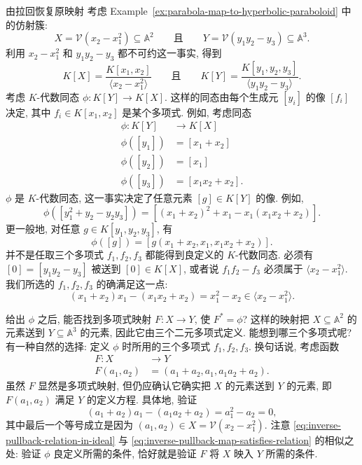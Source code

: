 \begin{Example}{由拉回恢复原映射}\leavevmode\label{ex:invert-pullback}
  考虑 Example~\ref{ex:parabola-map-to-hyperbolic-paraboloid} 中的仿射簇:
  \[
    X=\mathcal{V}(x_{2}-x_{1}^{2})\subseteq\mathbb{A}^{2}
    \qquad\text{且}\qquad
    Y=\mathcal{V}(y_{1}y_{2}-y_{3})\subseteq\mathbb{A}^{3}.
  \]
  利用 $x_{2}-x_{1}^{2}$ 和 $y_{1}y_{2}-y_{3}$ 都不可约这一事实, 得到
  \[
    K[X]=\frac{K[x_{1},x_{2}]}{\langle x_{2}-x_{1}^{2}\rangle}
    \qquad\text{且}\qquad
    K[Y]=\frac{K[y_{1},y_{2},y_{3}]}{\langle y_{1}y_{2}-y_{3}\rangle}.
  \]
  考虑 $K$-代数同态 $\phi:K[Y]\to K[X]$. 这样的同态由每个生成元 $[y_{i}]$ 的像 $[f_{i}]$ 决定, 其中 $f_{i}\in K[x_{1},x_{2}]$ 是某个多项式. 例如, 考虑同态
  \[
    \begin{aligned}
      \phi:K[Y]&\to K[X]\\
      \phi([y_{1}])&=[x_{1}+x_{2}]\\
      \phi([y_{2}])&=[x_{1}]\\
      \phi([y_{3}])&=[x_{1}x_{2}+x_{2}].
    \end{aligned}
  \]
  $\phi$ 是 $K$-代数同态, 这一事实决定了任意元素 $[g]\in K[Y]$ 的像. 例如,
  \[
    \phi([y_{1}^{2}+y_{2}-y_{2}y_{3}])=[(x_{1}+x_{2})^{2}+x_{1}-x_{1}(x_{1}x_{2}+x_{2})].
  \]
  更一般地, 对任意 $g\in K[y_{1},y_{2},y_{3}]$, 有
  \[
    \phi([g])=[g(x_{1}+x_{2},x_{1},x_{1}x_{2}+x_{2})].
  \]
  并不是任取三个多项式 $f_{1},f_{2},f_{3}$ 都能得到良定义的 $K$-代数同态. 必须有 $[0]=[y_{1}y_{2}-y_{3}]$ 被送到 $[0]\in K[X]$, 或者说 $f_{1}f_{2}-f_{3}$ 必须属于 $\langle x_{2}-x_{1}^{2}\rangle$. 我们所选的 $f_{1},f_{2},f_{3}$ 的确满足这一点:
  \begin{equation}\label{eq:inverse-pullback-relation-in-ideal}
    (x_{1}+x_{2})x_{1}-(x_{1}x_{2}+x_{2})=x_{1}^{2}-x_{2}\in\langle x_{2}-x_{1}^{2}\rangle.
  \end{equation}

  给出 $\phi$ 之后, 能否找到多项式映射 $F:X\to Y$, 使 $F^{*}=\phi$? 这样的映射把 $X\subseteq\mathbb{A}^{2}$ 的元素送到 $Y\subseteq\mathbb{A}^{3}$ 的元素, 因此它由三个二元多项式定义. 能想到哪三个多项式呢? 有一种自然的选择: 定义 $\phi$ 时所用的三个多项式 $f_{1},f_{2},f_{3}$. 换句话说, 考虑函数
  \[
    \begin{aligned}
      F:X&\to Y\\
      F(a_{1},a_{2})&=(a_{1}+a_{2},a_{1},a_{1}a_{2}+a_{2}).
    \end{aligned}
  \]
  虽然 $F$ 显然是多项式映射, 但仍应确认它确实把 $X$ 的元素送到 $Y$ 的元素, 即 $F(a_{1},a_{2})$ 满足 $Y$ 的定义方程. 具体地, 验证
  \begin{equation}\label{eq:inverse-pullback-map-satisfies-relation}
    (a_{1}+a_{2})a_{1}-(a_{1}a_{2}+a_{2})=a_{1}^{2}-a_{2}=0,
  \end{equation}
  其中最后一个等号成立是因为 $(a_{1},a_{2})\in X=\mathcal{V}(x_{2}-x_{1}^{2})$. 注意 \eqref{eq:inverse-pullback-relation-in-ideal} 与 \eqref{eq:inverse-pullback-map-satisfies-relation} 的相似之处: 验证 $\phi$ 良定义所需的条件, 恰好就是验证 $F$ 将 $X$ 映入 $Y$ 所需的条件.


\end{Example}
